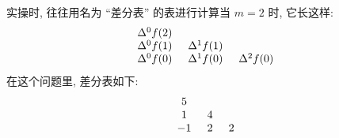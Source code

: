 \begin{example}
    实操时, 往往用名为 ``差分表'' 的表进行计算\period 当 $m = 2$ 时, 它长这样:
    \begin{align*}
        \arraycolsep=0.25cm
        \begin{array}{ccc}
            \Delta^{0} f(2) & \               & \               \\
            \Delta^{0} f(1) & \Delta^{1} f(1) & \               \\
            \Delta^{0} f(0) & \Delta^{1} f(0) & \Delta^{2} f(0) \\
        \end{array}
    \end{align*}
    在这个问题里, 差分表如下:
    \begin{align*}
        \arraycolsep=0.25cm
        \begin{array}{ccc}
            5  & \  & \ \\
            1  & 4  & \ \\
            -1 & 2  & 2 \\
        \end{array}
    \end{align*}
\end{example}

